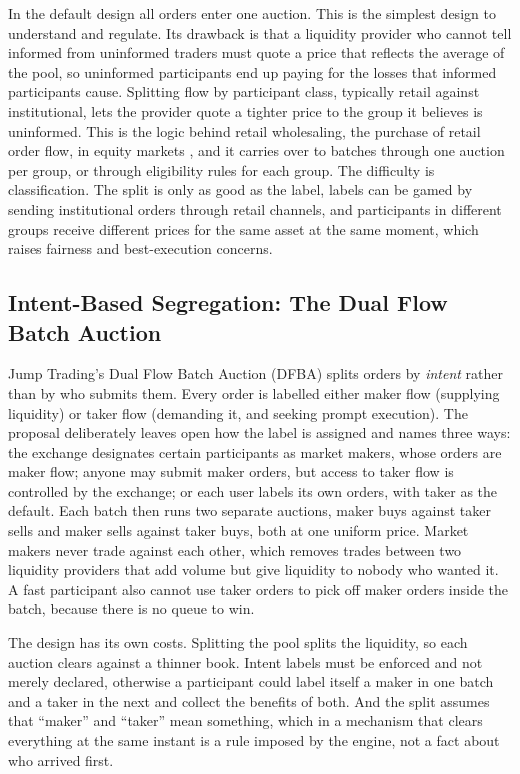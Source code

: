 In the default design all orders enter one auction. This is the simplest
design to understand and regulate. Its drawback is that a liquidity provider
who cannot tell informed from uninformed traders must quote a price that
reflects the average of the pool, so uninformed participants end up paying for
the losses that informed participants cause. Splitting flow by participant
class, typically retail against institutional, lets the provider quote a
tighter price to the group it believes is uninformed. This is the logic
behind retail wholesaling, the purchase of retail order flow, in equity
markets \citep{easley1996cream}, and it carries over to batches
through one auction per group, or through eligibility rules for each group.
The difficulty is classification. The split is only as good as the label,
labels can be gamed by sending institutional orders through retail channels,
and participants in different groups receive different prices for the same asset
at the same moment, which raises fairness and best-execution concerns.

\subsection{Intent-Based Segregation: The Dual Flow Batch Auction}

Jump Trading's Dual Flow Batch Auction (DFBA) \citep{jump2025dfba} splits
orders by \emph{intent} rather than by who submits them. Every order is
labelled either maker flow (supplying liquidity) or taker flow (demanding
it, and seeking prompt execution). The proposal deliberately leaves open
how the label is assigned and names three ways: the exchange designates
certain participants as market makers, whose orders are maker flow; anyone
may submit maker orders, but access to taker flow is controlled by the
exchange; or each user labels its own orders, with taker as the default.
Each batch then runs two separate auctions, maker buys against taker
sells and maker sells against taker buys, both at one uniform price. Market
makers never trade against each other, which removes trades between two
liquidity providers that add volume but give liquidity to nobody who wanted
it. A fast participant also cannot use taker orders to pick off maker orders
inside the batch, because there is no queue to win.

The design has its own costs. Splitting the pool splits the liquidity, so each
auction clears against a thinner book. Intent labels must be enforced and not
merely declared, otherwise a participant could label itself a maker in one
batch and a taker in the next and collect the benefits of both. And the split
assumes that ``maker'' and ``taker'' mean something, which in a mechanism that
clears everything at the same instant is a rule imposed by the engine, not a
fact about who arrived first.


